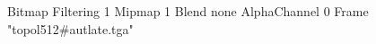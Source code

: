 {Bitmap
	{Filtering 1}
	{Mipmap 1}
	{Blend none}
	{AlphaChannel 0}
	{Frame "topol512#autlate.tga"}
}
